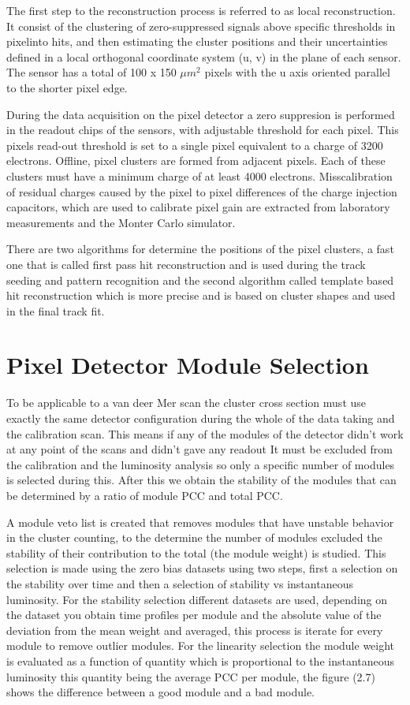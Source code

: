 The first step to the reconstruction process is referred to as local reconstruction. It consist of the clustering of zero-suppressed signals above specific thresholds in pixelinto hits, and then estimating the cluster positions and their uncertainties defined in a local orthogonal coordinate system (u, v) in the plane of each sensor. The sensor has a total of 100 x 150 $\mu m^{2}$ pixels with the u axis oriented parallel to the shorter pixel edge.  \cite{cluster2}  

During the data acquisition on the pixel detector a zero suppresion is performed in the readout chips of the sensors, with adjustable threshold for each pixel. This pixels read-out threshold is set to a single pixel equivalent to a charge of 3200 electrons. Offline, pixel clusters are formed from adjacent pixels. Each of these clusters must have a minimum charge of at least 4000 electrons. Misscalibration of residual charges caused by the pixel to pixel differences of the charge injection capacitors, which are used to calibrate pixel gain are extracted from laboratory measurements and the Monter Carlo simulator. 

There are two algorithms for determine the positions of the pixel clusters, a fast one that is called first pass hit reconstruction and is used during the track seeding and pattern recognition and the second algorithm called template based hit reconstruction which is more precise and is based on cluster shapes and used in the final track fit. 


\section{Pixel Detector Module Selection}

To be applicable to a van deer Mer scan the cluster cross section must use exactly the same detector configuration during the whole of the data taking and the calibration scan. This means if any of the modules of the detector didn't work at any point of the scans and didn't gave any readout It must be excluded from the calibration and the luminosity analysis so only a specific number of modules is selected during this. After this we obtain the stability of the modules that can be determined by a ratio of module PCC and total PCC. \cite{PCC3}

A module veto list is created that removes modules that have unstable behavior in the cluster counting, to the determine the number of modules excluded the stability of their contribution to the total (the module weight) is studied. This selection is made using the zero bias datasets using two steps, first a selection on the stability over time and then a selection of stability vs instantaneous luminosity. For the stability selection different datasets are used, depending on the dataset you obtain time profiles per module and the absolute value of the deviation from the mean weight and averaged, this process is iterate for every module to remove outlier modules. For the linearity selection the module weight is evaluated as a function of quantity which is proportional to the instantaneous luminosity this quantity being the average PCC per module, the figure (2.7) shows the difference between a good module and a bad module. 

